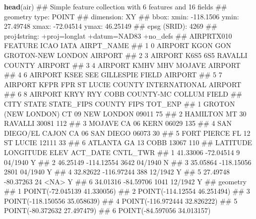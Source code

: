 \documentclass[11pt,ignorenonframetext,]{beamer}
\newenvironment{Shaded}{}{}
\newcommand{\KeywordTok}[1]{\textcolor[rgb]{0.00,0.44,0.13}{\textbf{#1}}}
\newcommand{\NormalTok}[1]{#1}
\let\oldShaded\Shaded
\let\endoldShaded\endShaded
\renewenvironment{Shaded}{\footnotesize\begin{spacing}{0.9}\oldShaded}{\endoldShaded\end{spacing}}
\let\oldverbatim\verbatim
\let\endoldverbatim\endverbatim
\newcommand{\tinyoutput}{
  \renewenvironment{Shaded}{\tiny\begin{spacing}{0.9}\oldShaded}{\endoldShaded\end{spacing}}
  \renewenvironment{verbatim}{\tiny\begin{spacing}{0.9}\oldverbatim}{\endoldverbatim\end{spacing}}
}
\begin{document}
\begin{frame}[fragile,t]{}

\tinyoutput

\begin{Shaded}
\begin{Highlighting}[]
\KeywordTok{head}\NormalTok{(air)}
\NormalTok{## Simple feature collection with 6 features and 16 fields}
\NormalTok{## geometry type:  POINT}
\NormalTok{## dimension:      XY}
\NormalTok{## bbox:           xmin: -118.1506 ymin: 27.49748 xmax: -72.04514 ymax: 46.25149}
\NormalTok{## epsg (SRID):    4269}
\NormalTok{## proj4string:    +proj=longlat +datum=NAD83 +no_defs}
\NormalTok{##   AIRPRTX010 FEATURE ICAO IATA                            AIRPT_NAME}
\NormalTok{## 1          0 AIRPORT KGON  GON             GROTON-NEW LONDON AIRPORT}
\NormalTok{## 2          3 AIRPORT K6S5  6S5                RAVALLI COUNTY AIRPORT}
\NormalTok{## 3          4 AIRPORT KMHV  MHV                        MOJAVE AIRPORT}
\NormalTok{## 4          6 AIRPORT KSEE  SEE               GILLESPIE FIELD AIRPORT}
\NormalTok{## 5          7 AIRPORT KFPR  FPR ST LUCIE COUNTY INTERNATIONAL AIRPORT}
\NormalTok{## 6          8 AIRPORT KRYY  RYY           COBB COUNTY-MC COLLUM FIELD}
\NormalTok{##                  CITY STATE STATE_FIPS     COUNTY  FIPS TOT_ENP}
\NormalTok{## 1 GROTON (NEW LONDON)    CT         09 NEW LONDON 09011      75}
\NormalTok{## 2            HAMILTON    MT         30    RAVALLI 30081     112}
\NormalTok{## 3              MOJAVE    CA         06       KERN 06029     135}
\NormalTok{## 4  SAN DIEGO/EL CAJON    CA         06  SAN DIEGO 06073      30}
\NormalTok{## 5         FORT PIERCE    FL         12   ST LUCIE 12111      33}
\NormalTok{## 6             ATLANTA    GA         13       COBB 13067     110}
\NormalTok{##   LATITUDE  LONGITUDE ELEV ACT_DATE CNTL_TWR}
\NormalTok{## 1 41.33006  -72.04514    9  04/1940        Y}
\NormalTok{## 2 46.25149 -114.12554 3642  04/1940        N}
\NormalTok{## 3 35.05864 -118.15056 2801  04/1940        Y}
\NormalTok{## 4 32.82622 -116.97244  388  12/1942        Y}
\NormalTok{## 5 27.49748  -80.37263   24     <NA>        Y}
\NormalTok{## 6 34.01316  -84.59706 1041  12/1942        Y}
\NormalTok{##                       geometry}
\NormalTok{## 1  POINT(-72.045139 41.330056)}
\NormalTok{## 2  POINT(-114.12554 46.251494)}
\NormalTok{## 3 POINT(-118.150556 35.058639)}
\NormalTok{## 4 POINT(-116.972444 32.826222)}
\NormalTok{## 5  POINT(-80.372632 27.497479)}
\NormalTok{## 6  POINT(-84.597056 34.013157)}
\end{Highlighting}
\end{Shaded}

\end{frame}
\end{document}
